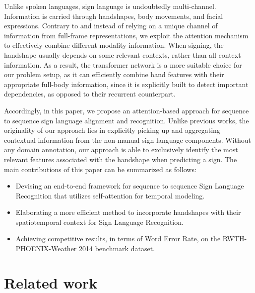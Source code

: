 \documentclass[a4paper,conference]{IEEEtran}
\begin{document}
Unlike spoken languages, sign language is undoubtedly multi-channel. Information is carried through handshapes, body movements, and facial expressions. Contrary to \cite{camgoz2020} and instead of relying on a unique channel of information from full-frame representations, we exploit the attention mechanism to effectively combine different modality information. When signing, the handshape usually depends on some relevant contexts, rather than all context information. As a result, the transformer network is a more suitable choice for our problem setup, as it can efficiently combine hand features with their appropriate full-body information, since it is explicitly built to detect important dependencies, as opposed to their recurrent counterpart.

Accordingly, in this paper, we propose an attention-based approach for sequence to sequence sign language alignment and recognition. Unlike previous works, the originality of our approach lies in explicitly picking up and aggregating contextual information from the non-manual sign language components. Without any domain annotation, our approach is able to exclusively identify the most relevant features associated with the handshape when predicting a sign. The main contributions of this paper can be summarized as follows:   

\begin{itemize}


\item{Devising an end-to-end framework for sequence to sequence Sign Language Recognition that utilizes self-attention for temporal modeling. }

\item{Elaborating a more efficient method to incorporate handshapes with their spatiotemporal context for Sign Language Recognition.}

\item{Achieving competitive results, in terms of Word Error Rate, on the RWTH-PHOENIX-Weather 2014 benchmark dataset.}


\end{itemize}



\section{Related work}
\end{document}
